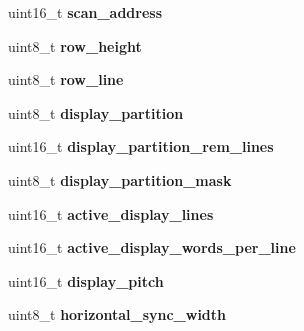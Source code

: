 \begin{DoxyCompactItemize}
\item 
\hypertarget{structPC98__GDC__state_a654e9a32973bd64bf883d497bc2a8431}{uint16\-\_\-t {\bfseries scan\-\_\-address}}\label{structPC98__GDC__state_a654e9a32973bd64bf883d497bc2a8431}

\item 
\hypertarget{structPC98__GDC__state_adbba69a00d55ac29528a9656aeae90c5}{uint8\-\_\-t {\bfseries row\-\_\-height}}\label{structPC98__GDC__state_adbba69a00d55ac29528a9656aeae90c5}

\item 
\hypertarget{structPC98__GDC__state_a3ab8bbf49d9e8efca947afa03cd77bc9}{uint8\-\_\-t {\bfseries row\-\_\-line}}\label{structPC98__GDC__state_a3ab8bbf49d9e8efca947afa03cd77bc9}

\item 
\hypertarget{structPC98__GDC__state_a9ef7dbeccbb9a9c915b0c020d6e3290e}{uint8\-\_\-t {\bfseries display\-\_\-partition}}\label{structPC98__GDC__state_a9ef7dbeccbb9a9c915b0c020d6e3290e}

\item 
\hypertarget{structPC98__GDC__state_ad71b8aec898372d6913ad66e3ce17f19}{uint16\-\_\-t {\bfseries display\-\_\-partition\-\_\-rem\-\_\-lines}}\label{structPC98__GDC__state_ad71b8aec898372d6913ad66e3ce17f19}

\item 
\hypertarget{structPC98__GDC__state_a57cc8033233ce0efec486e96b3c9e52b}{uint8\-\_\-t {\bfseries display\-\_\-partition\-\_\-mask}}\label{structPC98__GDC__state_a57cc8033233ce0efec486e96b3c9e52b}

\item 
\hypertarget{structPC98__GDC__state_a5d8da8d74cac150e8fc674d006c894cf}{uint16\-\_\-t {\bfseries active\-\_\-display\-\_\-lines}}\label{structPC98__GDC__state_a5d8da8d74cac150e8fc674d006c894cf}

\item 
\hypertarget{structPC98__GDC__state_a37d15232d351276cbf58d1db56699e2c}{uint16\-\_\-t {\bfseries active\-\_\-display\-\_\-words\-\_\-per\-\_\-line}}\label{structPC98__GDC__state_a37d15232d351276cbf58d1db56699e2c}

\item 
\hypertarget{structPC98__GDC__state_a0546c8864db0e1b4565e983409dadcd7}{uint16\-\_\-t {\bfseries display\-\_\-pitch}}\label{structPC98__GDC__state_a0546c8864db0e1b4565e983409dadcd7}

\item 
\hypertarget{structPC98__GDC__state_a42abdf51ea59faac4bb55e86500d627f}{uint8\-\_\-t {\bfseries horizontal\-\_\-sync\-\_\-width}}\label{structPC98__GDC__state_a42abdf51ea59faac4bb55e86500d627f}


\end{DoxyCompactItemize}
